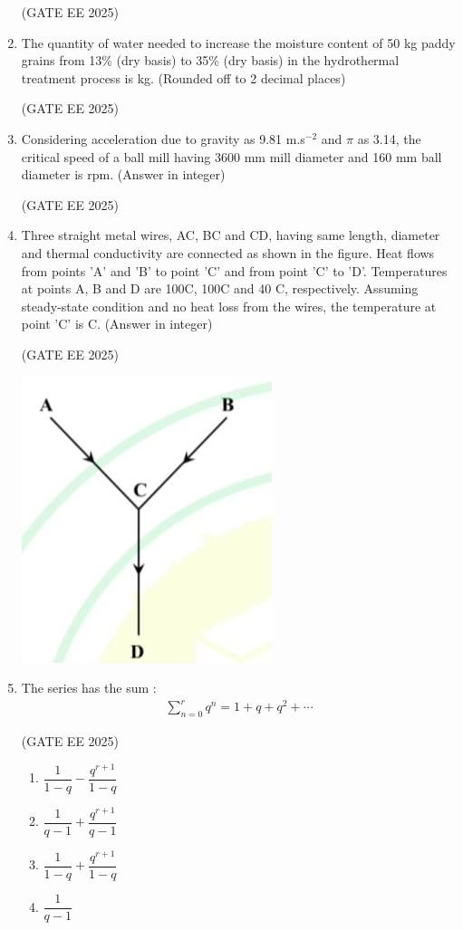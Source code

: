 \documentclass[journal,12pt,onecolumn]{IEEEtran}
\theoremstyle{remark}
\begin{document}
\begin{enumerate}
\hfill(GATE EE 2025)

\item The quantity of water needed to increase the moisture content of 50 kg paddy grains from 13\% (dry basis) to 35\% (dry basis) in the hydrothermal treatment process is\underline{\hspace{2cm}} kg. (Rounded off to 2 decimal places)

\hfill(GATE EE 2025)

\item Considering acceleration due to gravity as 9.81 m.s$^{-2}$ and $\pi$ as 3.14, the critical speed of a ball mill having 3600 mm mill diameter and 160 mm ball diameter is \underline{\hspace{2cm}} rpm. (Answer in integer)

\hfill(GATE EE 2025)

\item Three straight metal wires, AC, BC and CD, having same length, diameter and thermal conductivity are connected as shown in the figure. Heat flows from points 'A' and 'B' to point 'C' and from point 'C' to 'D'. Temperatures at points A, B and D are 100{\degree}C, 100{\degree}C and 40 {\degree}C, respectively. Assuming steady-state condition and no heat loss from the wires, the temperature at point 'C' is \underline{\hspace{2cm}} {\degree}C. (Answer in integer)

\hfill(GATE EE 2025)

 \includegraphics[width=0.3\linewidth]{figs/Fig 8.jpg}
\item The series has the sum : \begin{align*}
   \sum_{n=0}^{r} q^n = 1 + q + q^2 + \cdots 
\end{align*}

\hfill(GATE EE 2025)

\begin{multicols}{4}
\begin{enumerate}
\item $\dfrac{1}{1-q} - \dfrac{q^{r+1}}{1-q}$
\item $\dfrac{1}{q-1} + \dfrac{q^{r+1}}{q-1}$
\item $\dfrac{1}{1-q} + \dfrac{q^{r+1}}{1-q}$
\item $\dfrac{1}{q-1}$
\end{enumerate}
\end{multicols}


\end{enumerate}
\end{document}
